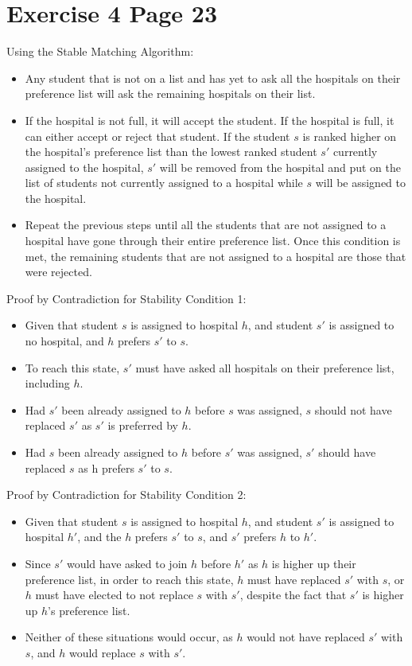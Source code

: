 \documentclass[11pt]{article}
\begin{document}
\section*{Exercise 4 Page 23}
Using the Stable Matching Algorithm:
\begin{itemize}
\item Any student that is not on a list and has yet to ask all the hospitals on their preference list will ask the remaining hospitals on their list.
\item If the hospital is not full, it will accept the student. If the hospital is full, it can either accept or reject that student. If the student $s$ is ranked higher on the hospital's preference list than the lowest ranked student $s'$ currently assigned to the hospital, $s'$ will be removed from the hospital and put on the list of students not currently assigned to a hospital while $s$ will be assigned to the hospital.
\item Repeat the previous steps until all the students that are not assigned to a hospital have gone through their entire preference list. Once this condition is met, the remaining students that are not assigned to a hospital are those that were rejected.
\end{itemize}
Proof by Contradiction for Stability Condition 1:
\begin{itemize}
\item Given that student $s$ is assigned to hospital $h$, and student $s'$ is assigned to no hospital, and $h$ prefers $s'$ to $s$.
\item To reach this state, $s'$ must have asked all hospitals on their preference list, including $h$.
\item Had $s'$ been already assigned to $h$ before $s$ was assigned, $s$ should not have replaced $s'$ as $s'$ is preferred by $h$.
\item Had $s$ been already assigned to $h$ before $s'$ was assigned, $s'$ should have replaced $s$ as h prefers $s'$ to $s$.
\end{itemize}
Proof by Contradiction for Stability Condition 2:
\begin{itemize}
\item Given that student $s$ is assigned to hospital $h$, and student $s'$ is assigned to hospital $h'$, and the $h$ prefers $s'$ to $s$, and $s'$ prefers $h$ to $h'$.
\item Since $s'$ would have asked to join $h$ before $h'$ as $h$ is higher up their preference list, in order to reach this state, $h$ must have replaced $s'$ with $s$, or $h$ must have elected to not replace $s$ with $s'$, despite the fact that $s'$ is higher up $h$'s preference list.
\item Neither of these situations would occur, as $h$ would not have replaced $s'$ with $s$, and $h$ would replace $s$ with $s'$.
\end{itemize}
\newpage
\end{document}
